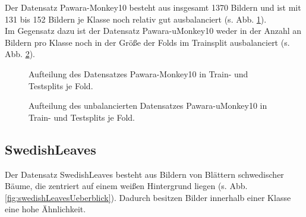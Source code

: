 Der Datensatz Pawara-Monkey10 besteht aus insgesamt 1370 Bildern und ist mit 131 bis 152 Bildern je Klasse noch relativ gut ausbalanciert (s. Abb. \ref{fig:Pawara-Monkey10Zusammensetzung}).\\

Im Gegensatz dazu ist der Datensatz Pawara-uMonkey10 weder in der Anzahl an Bildern pro Klasse noch in der Größe der Folds im Trainsplit ausbalanciert (s. Abb. \ref{fig:Pawara-uMonkey10Zusammensetzung}). 


\begin{figure}[H]
\begin{adjustbox}{width=1.2\textwidth, center}

\end{adjustbox}
\caption{Aufteilung des Datensatzes Pawara-Monkey10 \cite{pawaraWebsiteDatensaetze} in Train- und Testsplits je Fold.}
\label{fig:Pawara-Monkey10Zusammensetzung}
\end{figure}
\begin{figure}[H]
\begin{adjustbox}{width=1.2\textwidth, center}

\end{adjustbox}
\caption{Aufteilung des unbalancierten Datensatzes Pawara-uMonkey10 \cite{pawaraWebsiteDatensaetze} in Train- und Testsplits je Fold.}
\label{fig:Pawara-uMonkey10Zusammensetzung}
\end{figure}





\subsection{SwedishLeaves}
\label{ch:methodik_SwedishLeaves}
Der Datensatz SwedishLeaves \cite{swedishLeaves} besteht aus Bildern von Blättern schwedischer Bäume, die zentriert auf einem weißen Hintergrund liegen (s. Abb. \ref{fig:swedishLeavesUeberblick}). Dadurch besitzen Bilder innerhalb einer Klasse eine hohe Ähnlichkeit.

